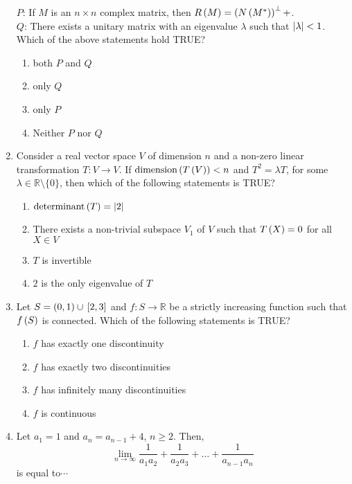 \documentclass[journal,12pt,twocolumn]{IEEEtran}
\theoremstyle{remark}
\begin{document}
\begin{enumerate}[start=1]
         $P$: If $M$ is an $n \times n$ complex matrix, then $R\left(M\right) = \left(N\left(M^*\right)\right)^\perp+$.\\
        $Q$: There exists a unitary matrix with an eigenvalue $\lambda$ such that $\left\vert\lambda\right\vert < 1$.\\
    Which of the above statements hold TRUE?
    \begin{enumerate}
        \item both $P$ and $Q$
        \item only $Q$
        \item only $P$
        \item Neither $P$ nor $Q$
    \end{enumerate}

    \item Consider a real vector space $V$ of dimension $n$ and a non-zero linear transformation $T: V \to V$. If $\text{dimension}\left(T\left(V\right)\right) < n$ and $T^2 = \lambda T$, for some $\lambda \in \mathbb{R} \setminus \{0\}$, then which of the following statements is TRUE?
    \begin{enumerate}
        \item $\text{determinant}\left(T\right) = \left\vert2\right\vert$
        \item There exists a non-trivial subspace $V_1$ of $V$ such that $T\left(X\right) = 0$ for all $X \in V$
        \item $T$ is invertible
        \item $2$ is the only eigenvalue of $T$
    \end{enumerate}

    \item Let $S = \left(0,1\right) \cup {}\left[2,3\right]$ and $f: S \to \mathbb{R}$ be a strictly increasing function such that $f\left(S\right)$ is connected. Which of the following statements is TRUE?
    \begin{enumerate}
        \item $f$ has exactly one discontinuity
        \item $f$ has exactly two discontinuities
        \item $f$ has infinitely many discontinuities
        \item $f$ is continuous
    \end{enumerate}

    \item Let $a_1 = 1$ and $a_n = a_{n-1} + 4$, $n \geq 2$. Then,
    $$\lim_{n \to \infty} \frac{1}{a_1 a_2} + \frac{1}{a_2 a_3} + \dots + \frac{1}{a_{n-1} a_n}$$
    is equal to$\cdots$


\end{enumerate}
\end{document}
